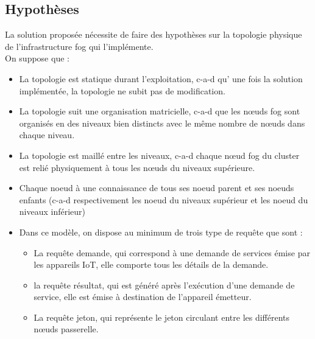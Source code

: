 \subsection{Hypothèses}
La solution proposée nécessite de faire des hypothèses sur la topologie physique de l’infrastructure fog qui l’implémente.\\
On suppose que : 
\begin{itemize}
    \item La topologie est statique durant l’exploitation, c-a-d qu' une fois la solution implémentée, la topologie ne subit pas de modification.
    \item La topologie suit une organisation matricielle, c-a-d que les nœuds fog sont organisés en des niveaux bien distincts avec le même nombre de nœuds dans chaque niveau.
    \item La topologie est maillé entre les niveaux, c-a-d chaque nœud fog du cluster est relié physiquement à tous les nœuds du niveaux supérieure.
    \item Chaque noeud à une connaissance de tous ses noeud parent et ses noeuds enfants (c-a-d respectivement les noeud du niveaux supérieur et les noeud du niveaux inférieur)
    \item Dans ce modèle, on dispose au minimum de trois type de requête que sont : \\
          \begin{itemize}
             \item La requête demande, qui correspond à une demande de services émise par les appareils IoT, elle comporte tous les détails de la demande.
             \item la requête résultat, qui est généré après l’exécution d’une demande de service, elle est émise à destination de l'appareil émetteur.
             \item La requête jeton, qui représente le jeton circulant entre les différents nœuds passerelle.
          \end{itemize}
\end{itemize}
